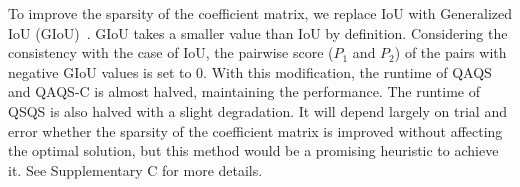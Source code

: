 To improve the sparsity of the coefficient matrix, we replace IoU with Generalized IoU (GIoU)~\cite{RezatofighiTGS019GIoU}. GIoU takes a smaller value than IoU by definition. Considering the consistency with the case of IoU, the pairwise score ($P_1$ and $P_2$) of the pairs with negative GIoU values is set to 0. With this modification, the runtime of QAQS and QAQS-C is almost halved, maintaining the performance. The runtime of QSQS is also halved with a slight degradation. It will depend largely on trial and error whether the sparsity of the coefficient matrix is improved without affecting the optimal solution, but this method would be a promising heuristic to achieve it.
See Supplementary C for more details.